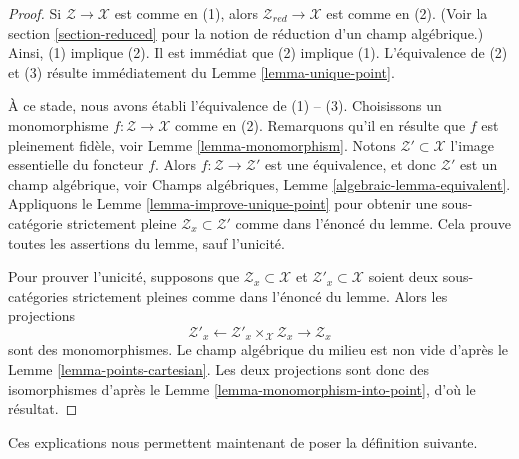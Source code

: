 \begin{proof}
Si $\mathcal{Z} \to \mathcal{X}$ est comme en (1), alors
$\mathcal{Z}_{red} \to \mathcal{X}$ est comme en (2). (Voir la
section \ref{section-reduced}
pour la notion de réduction d'un champ algébrique.)
Ainsi, (1) implique (2).
Il est immédiat que (2) implique (1).
L'équivalence de (2) et (3) résulte immédiatement du
Lemme \ref{lemma-unique-point}.

\medskip\noindent
À ce stade, nous avons établi l'équivalence de (1) -- (3).
Choisissons un monomorphisme $f : \mathcal{Z} \to \mathcal{X}$ comme en (2).
Remarquons qu'il en résulte que $f$ est pleinement fidèle, voir
Lemme \ref{lemma-monomorphism}.
Notons $\mathcal{Z}' \subset \mathcal{X}$ l'image essentielle du foncteur
$f$. Alors $f : \mathcal{Z} \to \mathcal{Z}'$ est une équivalence, et donc
$\mathcal{Z}'$ est un champ algébrique, voir
Champs algébriques, Lemme \ref{algebraic-lemma-equivalent}.
Appliquons le
Lemme \ref{lemma-improve-unique-point}
pour obtenir une sous-catégorie strictement pleine $\mathcal{Z}_x \subset \mathcal{Z}'$
comme dans l'énoncé du lemme.
Cela prouve toutes les assertions du lemme, sauf l'unicité.

\medskip\noindent
Pour prouver l'unicité, supposons que
$\mathcal{Z}_x \subset \mathcal{X}$
et
$\mathcal{Z}'_x \subset \mathcal{X}$
soient deux sous-catégories strictement pleines comme dans l'énoncé du lemme.
Alors les projections
$$
\mathcal{Z}'_x
\longleftarrow
\mathcal{Z}'_x \times_\mathcal{X} \mathcal{Z}_x
\longrightarrow
\mathcal{Z}_x
$$
sont des monomorphismes. Le champ algébrique du milieu est non vide d'après le
Lemme \ref{lemma-points-cartesian}.
Les deux projections sont donc des isomorphismes d'après le
Lemme \ref{lemma-monomorphism-into-point},
d'où le résultat.
\end{proof}

\noindent
Ces explications nous permettent maintenant de poser la définition suivante.

